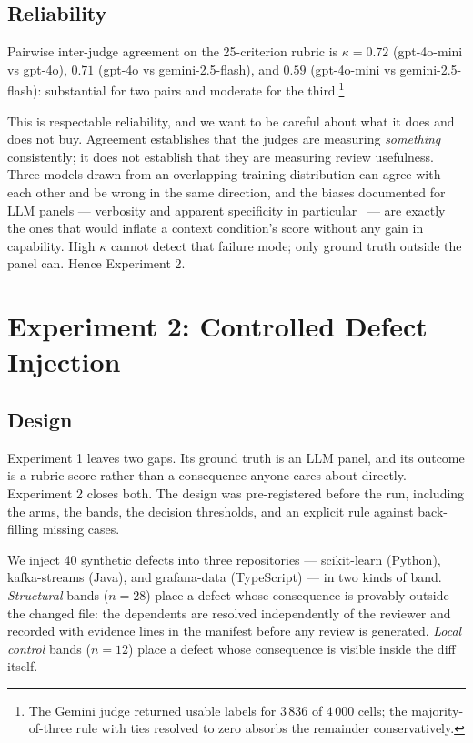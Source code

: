 \documentclass[conference]{IEEEtran}
\begin{document}
\subsection{Reliability}
Pairwise inter-judge agreement on the 25-criterion rubric is
$\kappa = 0.72$ (gpt-4o-mini vs gpt-4o), $0.71$ (gpt-4o vs
gemini-2.5-flash), and $0.59$ (gpt-4o-mini vs gemini-2.5-flash): substantial
for two pairs and moderate for the third.\footnote{The Gemini judge returned
usable labels for $3\,836$ of $4\,000$ cells; the majority-of-three rule with
ties resolved to zero absorbs the remainder conservatively.}

This is respectable reliability, and we want to be careful about what it does
and does not buy. Agreement establishes that the judges are measuring
\emph{something} consistently; it does not establish that they are measuring
review usefulness. Three models drawn from an overlapping training
distribution can agree with each other and be wrong in the same direction,
and the biases documented for LLM panels --- verbosity and apparent
specificity in particular~\cite{zheng2023judging} --- are exactly the ones
that would inflate a context condition's score without any gain in
capability. High $\kappa$ cannot detect that failure mode; only ground truth
outside the panel can. Hence Experiment 2.

\section{Experiment 2: Controlled Defect Injection}
\label{sec:exp2}

\subsection{Design}
Experiment 1 leaves two gaps. Its ground truth is an LLM panel, and its
outcome is a rubric score rather than a consequence anyone cares about
directly. Experiment 2 closes both. The design was pre-registered before the
run, including the arms, the bands, the decision thresholds, and an explicit
rule against back-filling missing cases.

We inject 40 synthetic defects into three repositories --- scikit-learn
(Python), kafka-streams (Java), and grafana-data (TypeScript) --- in two
kinds of band. \emph{Structural} bands ($n=28$) place a defect whose
consequence is provably outside the changed file: the dependents are
resolved independently of the reviewer and recorded with evidence lines in
the manifest before any review is generated. \emph{Local control} bands
($n=12$) place a defect whose consequence is visible inside the diff itself.
\end{document}
